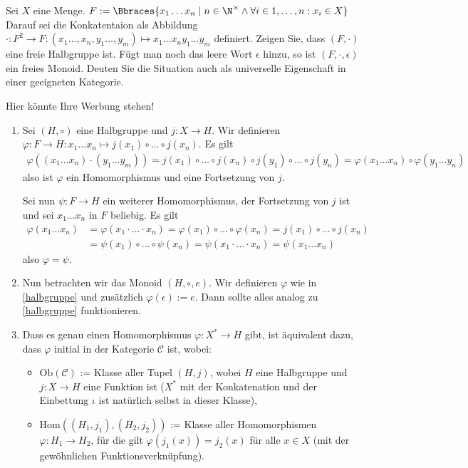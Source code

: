 \begin{exercise}
    Sei $X$ eine Menge. $F := \Bbraces{x_1 \dots x_n \mid n \in \N^\times \land \forall i \in {1, \dots, n}: x_i \in X}$ Darauf sei die Konkatentaion als Abbildung $\cdot: F^2 \to F: (x_1 \dots, x_n, y_1 \dots, y_m) \mapsto x_1 \dots x_n y_1 \dots y_m$ definiert. Zeigen Sie, dass $(F, \cdot)$ eine freie Halbgruppe ist. Fügt man noch das leere Wort $\epsilon$ hinzu, so ist $(F, \cdot, \epsilon)$ ein freies Monoid. Deuten Sie die Situation auch als universelle Eigenschaft in einer geeigneten Kategorie.
\end{exercise}

\begin{solution}
    Hier könnte Ihre Werbung stehen!
    \begin{enumerate}[label = \arabic*)]
        \item \label{halbgruppe} Sei $(H, \circ)$ eine Halbgruppe und $j:X \to H$. Wir definieren $\varphi: F \to H: x_1 \dots x_n \mapsto j(x_1) \circ \dots \circ j(x_n)$. Es gilt
        \begin{align*}
            \varphi((x_1 \dots x_n) \cdot (y_1 \dots y_m)) = j(x_1) \circ \dots \circ j(x_n) \circ j(y_1) \circ \dots \circ j(y_n) = \varphi(x_1 \dots x_n) \circ \varphi(y_1 \dots y_n)
        \end{align*} 
        also ist $\varphi$ ein Homomorphismus und eine Fortsetzung von $j$.

        Sei nun $\psi: F \to H$ ein weiterer Homomorphismus, der Fortsetzung von $j$ ist und sei $x_1 \dots x_n$ in $F$ beliebig. Es gilt
        \begin{align*}
            \varphi(x_1 \dots x_n) &= \varphi(x_1 \cdot \dots \cdot x_n) = \varphi(x_1) \circ \dots \circ \varphi(x_n) = j(x_1) \circ \dots \circ j(x_n) \\
            &= \psi(x_1) \circ \dots \circ \psi(x_n) = \psi(x_1 \cdot \dots \cdot x_n) = \psi(x_1 \dots x_n)
        \end{align*}
        also $\varphi = \psi$.
        \item Nun betrachten wir das Monoid $(H, \circ, e)$. Wir definieren $\varphi$ wie in \ref{halbgruppe} und zusätzlich $\varphi(\epsilon) := e$. Dann sollte alles analog zu \ref{halbgruppe} funktionieren. 
        \item Dass es genau einen Homomorphismus $\varphi: X^* \rightarrow H$ gibt, ist äquivalent dazu, dass $\varphi$ initial in der Kategorie $\mathcal{C}$ ist, wobei:

\begin{itemize}
    \item $\mathrm{Ob}(\mathcal{C})$ := Klasse aller Tupel $(H, j)$, wobei $H$ eine Halbgruppe und $j: X \rightarrow H$ eine Funktion ist ($X^*$ mit der Konkatenation und der Einbettung $\iota$ ist natürlich selbst in dieser Klasse),
    \item $\mathrm{Hom}((H_1, j_1), (H_2, j_2))$ := Klasse aller Homomorphismen $\varphi: H_1 \rightarrow H_2$, für die gilt $\varphi(j_1 (x)) = j_2 (x)$ für alle $x \in X$ (mit der gewöhnlichen Funktionsverknüpfung).
    \end{itemize}
    \end{enumerate}
\end{solution}

